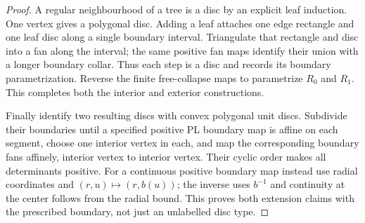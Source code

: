 \begin{proof}
A regular neighbourhood of a tree is a disc by an explicit leaf
induction. One vertex gives a polygonal disc. Adding a leaf attaches
one edge rectangle and one leaf disc along a single boundary interval.
Triangulate that rectangle and disc into a fan along the interval; the
same positive fan maps identify their union with a longer boundary
collar. Thus each step is a disc and records its boundary parametrization.
Reverse the finite free-collapse maps to parametrize $R_0$ and $R_1$.
This completes both the interior and exterior constructions.

Finally identify two resulting discs with convex polygonal unit discs.
Subdivide their boundaries until a specified positive PL boundary map
is affine on each segment, choose one interior vertex in each, and map
the corresponding boundary fans affinely, interior vertex to interior
vertex. Their cyclic order makes all determinants positive. For a
continuous positive boundary map instead use radial coordinates and
$(r,u)\mapsto(r,b(u))$; the inverse uses $b^{-1}$ and continuity at
the center follows from the radial bound. This proves both extension
claims with the prescribed boundary, not just an unlabelled disc type.
\end{proof}

